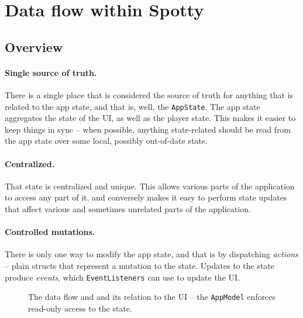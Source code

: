 \documentclass[12pt, a4paper]{article}
\begin{document}
\section{Data flow within Spotty}

\subsection{Overview}

\paragraph{Single source of truth.} There is a single place that is considered the source of truth for anything that is related to the app state, and that is, well, the \texttt{AppState}. The app state aggregates the state of the UI, as well as the player state. This makes it easier to keep things in sync -- when possible, anything state-related should be read from the app state over some local, possibly out-of-date state.

\paragraph{Centralized.} That state is centralized and unique. This allows various parts of the application to access any part of it, and conversely makes it easy to perform state updates that affect various and sometimes unrelated parts of the application.

\paragraph{Controlled mutations.} There is only one way to modify the app state, and that is by dispatching \emph{actions} -- plain structs that represent a mutation to the state. Updates to the state produce \emph{events}, which \texttt{EventListeners} can use to update the UI.

\begin{figure}[!h]

    \centering


    \caption{The data flow and and its relation to the UI -- the \texttt{AppModel} enforces read-only access to the state.}
    \label{fig:flow}

\end{figure}
\end{document}
